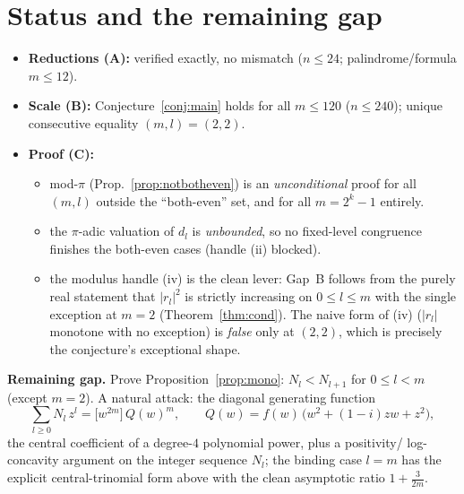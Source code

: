 \documentclass[11pt]{article}
\theoremstyle{definition}
\begin{document}
\section{Status and the remaining gap}

\begin{itemize}
\item \textbf{Reductions (A):} verified exactly, no mismatch ($n\le24$;
palindrome/formula $m\le12$).
\item \textbf{Scale (B):} Conjecture~\ref{conj:main} holds for all $m\le120$
($n\le240$); unique consecutive equality $(m,l)=(2,2)$.
\item \textbf{Proof (C):}
  \begin{itemize}
  \item mod-$\pi$ (Prop.~\ref{prop:notbotheven}) is an \emph{unconditional}
  proof for all $(m,l)$ outside the ``both-even'' set, and for all
  $m=2^k-1$ entirely.
  \item the $\pi$-adic valuation of $d_l$ is \emph{unbounded}, so no fixed-level
  congruence finishes the both-even cases (handle (ii) blocked).
  \item the modulus handle (iv) is the clean lever: Gap~B follows from the purely
  real statement that $|r_l|^2$ is strictly increasing on $0\le l\le m$ with the
  single exception at $m=2$ (Theorem~\ref{thm:cond}). The naive form of (iv)
  ($|r_l|$ monotone with no exception) is \emph{false} only at $(2,2)$, which is
  precisely the conjecture's exceptional shape.
  \end{itemize}
\end{itemize}

\noindent\textbf{Remaining gap.} Prove Proposition~\ref{prop:mono}:
$N_l<N_{l+1}$ for $0\le l<m$ (except $m=2$). A natural attack: the diagonal
generating function
\[
  \sum_{l\ge0}N_l\,z^l=\bigl[w^{2m}\bigr]\,Q(w)^m,\qquad
  Q(w)=f(w)\,\bigl(w^2+(1-i)zw+z^2\bigr),
\]
the central coefficient of a degree-$4$ polynomial power, plus a positivity/
log-concavity argument on the integer sequence $N_l$; the binding case $l=m$
has the explicit central-trinomial form above with the clean asymptotic ratio
$1+\tfrac{3}{2m}$.
\end{document}

